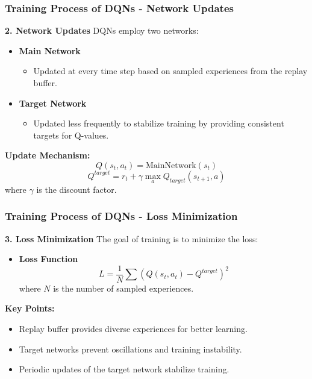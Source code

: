 \documentclass[aspectratio=169]{beamer}
\begin{document}
\begin{frame}[fragile]
    \frametitle{Training Process of DQNs - Network Updates}
    \textbf{2. Network Updates}
    DQNs employ two networks:
    \begin{itemize}
        \item \textbf{Main Network}
            \begin{itemize}
                \item Updated at every time step based on sampled experiences from the replay buffer.
            \end{itemize}
        \item \textbf{Target Network}
            \begin{itemize}
                \item Updated less frequently to stabilize training by providing consistent targets for Q-values.
            \end{itemize}
    \end{itemize}
    \textbf{Update Mechanism:}
    \begin{equation}
    Q(s_t, a_t) = \text{MainNetwork}(s_t)
    \end{equation}
    \begin{equation}
    Q^{target} = r_t + \gamma \max_a Q_{target}(s_{t+1}, a)
    \end{equation}
    where \(\gamma\) is the discount factor.
\end{frame}

\begin{frame}[fragile]
    \frametitle{Training Process of DQNs - Loss Minimization}
    \textbf{3. Loss Minimization}
    The goal of training is to minimize the loss:
    \begin{itemize}
        \item \textbf{Loss Function} 
        \begin{equation}
        L = \frac{1}{N} \sum (Q(s_t, a_t) - Q^{target})^2
        \end{equation}
        where \(N\) is the number of sampled experiences.
    \end{itemize}
    \textbf{Key Points:}
    \begin{itemize}
        \item Replay buffer provides diverse experiences for better learning.
        \item Target networks prevent oscillations and training instability.
        \item Periodic updates of the target network stabilize training.
    \end{itemize}
\end{frame}
\end{document}
